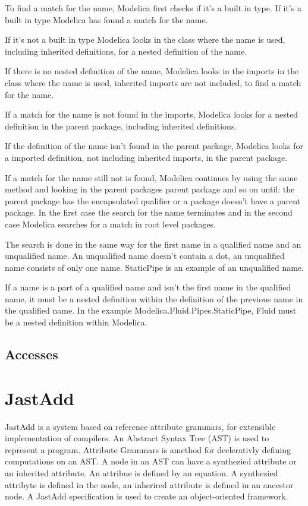 \documentclass{cslthse-msc}
\begin{document}
To find a match for the name, Modelica first checks if it's a built in type. If it's a built in type Modelica has found a match for the name.

If it's not a built in type Modelica looks in the class where the name is used, including inherited definitions, for a nested definition of the name. 

If there is no nested definition of the name, Modelica looks in the imports in the class where the name is used, inherited imports are not included, to find a match for the name.

If a match for the name is not found in the imports, Modelica looks for a nested definition in the parent package, including inherited definitions.

If the definition of the name isn't found in the parent package, Modelica looks for a imported definition, not including inherited imports, in the parent package.

If a match for the name still not is found, Modelica continues by using the same method and looking in the parent packages parent package and so on until: the parent package has the encapsulated qualifier or a package doesn't have a parent package. In the first case the search for the name terminates and in the second case Modelica searches for a match in root level packages.

The search is done in the same way for the first name in a qualified name and an unqualified name. An unqualified name doesn't contain a dot, an unqualified name consists of only one name. StaticPipe is an example of an unqualified name.

If a name is a part of a qualified name and isn't the first name in the qualified name, it must be a nested definition within the definition of the previous name in the qualified name. In the example Modelica.Fluid.Pipes.StaticPipe, Fluid must be a nested definition within Modelica.\cite{modelicamodelica, tillermodelica}

\subsection{Accesses}

\section{JastAdd}
JastAdd is a system based on reference attribute grammars, for extensible implementation of compilers. An Abstract Syntax Tree (AST) is used to represent a program. Attribute Grammars is amethod for declerativly defining computations on an AST. A node in an AST can have a synthezied attribute or an inherited attribute. An attribue is defined by an equation. A synthezied attribyte is defined in the node, an inherired attribute is defined in an ancestor node. A JastAdd specification is used to create an object-oriented framework.~\cite{aakesson2008development}
\end{document}
